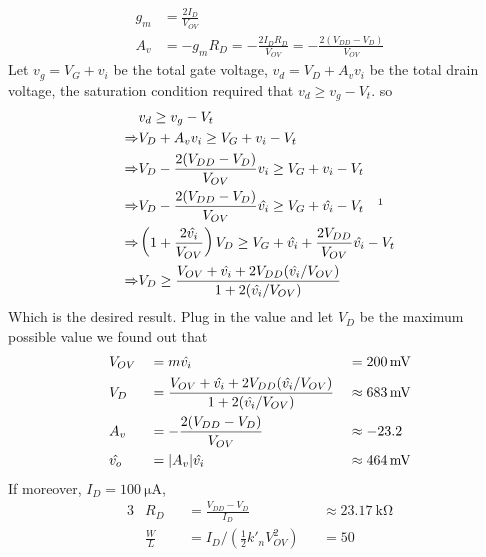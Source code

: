 \documentclass[12pt, a4paper]{article}
\begin{document}
\Ans\\
\begin{align*}
  g_m &= \frac{2I_D}{V_{OV}}\\
  A_v &= -g_m R_D = -\frac{2 I_D R_D}{V_{OV}}  = -\frac{2 (V_{DD} - V_D)}{V_{OV}} 
\end{align*}
Let $v_g = V_G + v_i$ be the total gate voltage, $v_d = V_D + A_v v_i$ be the total drain voltage, the saturation condition required that $v_d \geq v_g - V_t$. so
\begin{align*}
  & v_d \geq v_g - V_t \\
  \Rightarrow & V_D + A_v v_i \geq V_G + v_i - V_t  \\
  \Rightarrow & V_D - \frac{2 (V_{DD} - V_D)}{V_{OV}} v_i \geq V_G + v_i - V_t \\
  \Rightarrow  & V_D - \frac{2 (V_{DD} - V_D)}{V_{OV}} \hat{v_i} \geq V_G + \hat{v_i} - V_t \quad \footnotemark \\
  \Rightarrow & \left(1 + \frac{2\hat{v_i}}{V_{OV}}\right) V_D \geq V_G + \hat{v_i} + \frac{2V_{DD}}{V_{OV}} \hat{v_i}  - V_t  \\
  \Rightarrow & V_D \geq \frac{V_{OV} + \hat{v_i} + 2 V_{DD} (\hat{v_i} / V_{OV}) }{1 + 2(\hat{v_i}/V_{OV})} 
\end{align*}
Which is the desired result.
Plug in the value and let $V_D$ be the maximum possible value we found out that
\begin{alignat*}{3}
  & V_{OV} &&= m \hat{v_i} && = \SI{200}{\mV} \\
  & V_{D} &&= \frac{V_{OV} + \hat{v_i} + 2 V_{DD} (\hat{v_i} / V_{OV}) }{1 + 2(\hat{v_i}/V_{OV})} && \approx \SI{683}{\mV} \\
  & A_v &&= -\frac{2(V_{DD} - V_D)}{V_{OV}}  && \approx -23.2 \\
  & \hat{v_o} &&= \abs{A_v} \hat{v_i} && \approx \SI{464}\mV \\
\end{alignat*}
If moreover, $I_D = \SI{100}{\uA}$,
\begin{alignat*}{3}
  & R_D &&= \frac{V_{DD} - V_D}{I_D}  && \approx \SI{23.17}{\kohm} \\
  & \frac{W}{L} &&= I_D / \left(\frac{1}{2} k'_n V_{OV}^2 \right) && = 50
\end{alignat*}

\end{document}
